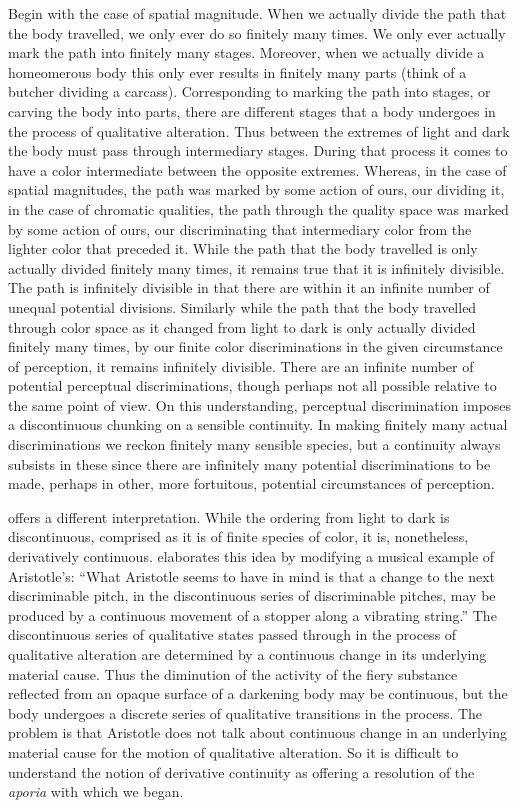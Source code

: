 Begin with the case of spatial magnitude. When we actually divide the path that the body travelled, we only ever do so finitely many times. We only ever actually mark the path into finitely many stages. Moreover, when we actually divide a homeomerous body this only ever results in finitely many parts (think of a butcher dividing a carcass). Corresponding to marking the path into stages, or carving the body into parts, there are different stages that a body undergoes in the process of qualitative alteration. Thus between the extremes of light and dark the body must pass through intermediary stages. During that process it comes to have a color intermediate between the opposite extremes. Whereas, in the case of spatial magnitudes, the path was marked by some action of ours, our dividing it, in the case of chromatic qualities, the path through the quality space was marked by some action of ours, our discriminating that intermediary color from the lighter color that preceded it. While the path that the body travelled is only actually divided finitely many times, it remains true that it is infinitely divisible. The path is infinitely divisible in that there are within it an infinite number of unequal potential divisions. Similarly while the path that the body travelled through color space as it changed from light to dark is only actually divided finitely many times, by our finite color discriminations in the given circumstance of perception, it remains infinitely divisible. There are an infinite number of potential perceptual discriminations, though perhaps not all possible relative to the same point of view. On this understanding, perceptual discrimination imposes a discontinuous chunking on a sensible continuity. In making finitely many actual discriminations we reckon finitely many sensible species, but a continuity always subsists in these since there are infinitely many potential discriminations to be made, perhaps in other, more fortuitous, potential circumstances of perception.

\citet[]{Sorabji:1976fk} offers a different interpretation. While the ordering from light to dark is discontinuous, comprised as it is of finite species of color, it is, nonetheless, derivatively continuous. \citet[80]{Sorabji:1976fk} elaborates this idea by modifying a musical example of Aristotle's: ``What Aristotle seems to have in mind is that a change to the next discriminable pitch, in the discontinuous series of discriminable pitches, may be produced by a continuous movement of a stopper along a vibrating string.'' The discontinuous series of qualitative states passed through in the process of qualitative alteration are determined by a continuous change in its underlying material cause. Thus the diminution of the activity of the fiery substance reflected from an opaque surface of a darkening body may be continuous, but the body undergoes a discrete series of qualitative transitions in the process. The problem is that Aristotle does not talk about continuous change in an underlying material cause for the motion of qualitative alteration. So it is difficult to understand the notion of derivative continuity as offering a resolution of the \emph{aporia} with which we began.

